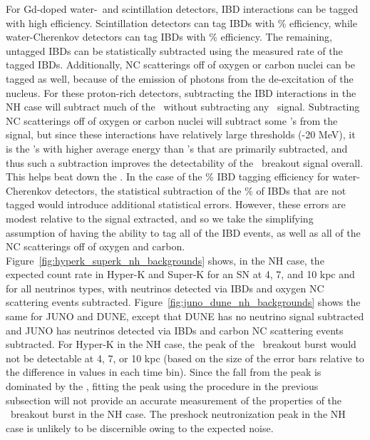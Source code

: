 For Gd-doped water-\cer\ and scintillation detectors, IBD interactions
    can be tagged with high efficiency.  Scintillation detectors can
    tag IBDs with \% 
    efficiency, while water-Cherenkov detectors can tag IBDs with
    \% efficiency.  The 
    remaining, untagged IBDs can be statistically subtracted using the measured rate of 
    the tagged IBDs.  Additionally, NC scatterings off of oxygen or carbon nuclei can be 
    tagged as well, because of the emission of photons from the de-excitation of the nucleus.  
    For these proton-rich detectors, subtracting the IBD interactions in the NH case will 
    subtract much of the \background\ without subtracting any \nue\ 
    signal.  Subtracting NC scatterings off of oxygen or carbon nuclei will subtract some 
    \nue's from the signal, but since these interactions have relatively large thresholds  
    (\abt 15-20 MeV), it is the \nux's with higher average energy than \nue's that are 
    primarily subtracted, and thus such a subtraction improves the detectability of the \nue\ 
    breakout signal overall.  This helps beat down the \backgrounds.  In 
    the case of the \abt 90\% IBD tagging efficiency for water-Cherenkov detectors, the 
    statistical subtraction of the \abt 10\% of IBDs that are not tagged would introduce 
    additional statistical errors.  However, these errors are modest relative to the signal 
    extracted, and so we take the simplifying assumption of having the ability to tag all of the IBD events, as well 
    as all of the NC scatterings off of oxygen and carbon.
Figure~\ref{fig:hyperk_superk_nh_backgrounds}
shows, in the NH case, the expected count rate in Hyper-K and Super-K 
for an SN at 4, 7, and
10 kpc and for all neutrinos types, with
neutrinos detected via IBDs and oxygen NC scattering events
subtracted.
Figure~\ref{fig:juno_dune_nh_backgrounds} shows the same for JUNO and
DUNE, except that DUNE has no neutrino signal subtracted and JUNO has
neutrinos detected via IBDs and carbon NC scattering events subtracted.
For Hyper-K in the NH case, the peak of the \nue\ breakout burst 
would not be detectable at 4, 7, or 10 kpc (based on the
size of the error bars relative to the difference in values in each
time bin).  Since 
the fall from the peak is dominated by the 
\backgrounds, fitting the
peak using the procedure in the previous subsection will not
provide an accurate measurement of the properties of the \nue\
breakout burst in the NH case.  The
preshock neutronization peak in the NH case is unlikely to be 
discernible owing to the expected noise.  

